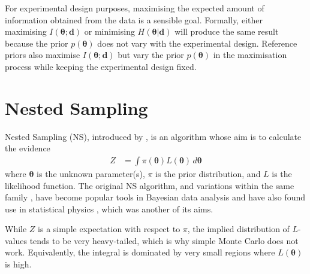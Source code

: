 \documentclass[entropy,article,accept,oneauthor,pdftex,10pt,a4paper]{mdpi}
\renewcommand{\d}{\boldsymbol{d}}
\newcommand{\x}{\boldsymbol{\theta}}
\begin{document}
For experimental design purposes, maximising the expected amount
of information obtained from the data is a sensible goal.
Formally, either maximising $I(\x; \d)$ or
minimising $H(\x | \d)$ will produce the same result because the prior $p(\x)$
does not
vary with the experimental design. Reference priors
\citep{bernardo2005reference} also maximise $I(\x; \d)$ but vary the prior
$p(\x)$
in the maximisation process while keeping the experimental design fixed.

\section{Nested Sampling}

Nested Sampling (NS), introduced by
\citet{skilling2006nested}, is an algorithm whose aim is
to calculate the evidence
\begin{align}
Z &= \int \pi(\x) L(\x) \, d\x
\end{align}
where $\x$ is the unknown parameter(s), $\pi$ is the prior distribution,
and $L$ is the likelihood function. The original NS algorithm, and variations
within the same family \citep{feroz2009multinest, dns, handley2015polychord},
have become popular tools in Bayesian data analysis
\citep{knuth2015bayesian, pullen2014bayesian, exoplanet} and have also
found use in statistical physics \citep{partay2010efficient,
baldock2016determining, martiniani2014superposition}, which was another of
its aims.

While $Z$ is a simple expectation with
respect to $\pi$, the
implied distribution of $L$-values tends to be very heavy-tailed, which is
why simple Monte Carlo does not work. Equivalently, the integral is dominated
by very small regions where $L(\x)$ is high.
\end{document}
